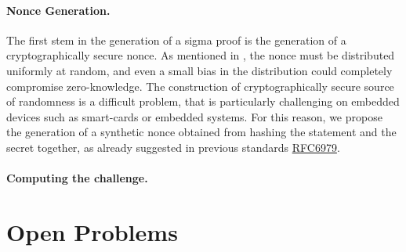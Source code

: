 \documentclass[runningheads]{llncs}
\begin{document}
\paragraph{Nonce Generation.} The first stem in the generation of a sigma proof is the generation of a cryptographically secure nonce. As mentioned in , the nonce must be distributed uniformly at random, and even a small bias in the distribution could completely compromise zero-knowledge.
The construction of cryptographically secure source of randomness is a difficult problem, that is particularly challenging on embedded devices such as smart-cards or embedded systems.
For this reason, we propose the generation of a synthetic nonce obtained from hashing the statement and the secret together, as already suggested in previous standards \href{https://tools.ietf.org/html/rfc6979}{RFC6979}.


\paragraph{Computing the challenge.}

\section{Open Problems}


%
\end{document}
